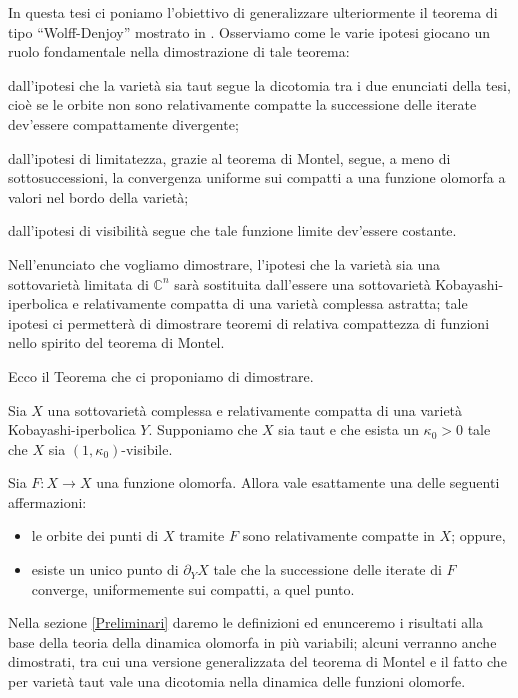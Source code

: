 In questa tesi ci poniamo l'obiettivo di generalizzare ulteriormente il teorema di tipo ``Wolff-Denjoy'' mostrato in \cite{CMS}. Osserviamo come le varie ipotesi giocano un ruolo fondamentale nella dimostrazione di tale teorema:
\begin{nlist}
    \item dall'ipotesi che la varietà sia taut segue la dicotomia tra i due enunciati della tesi, cioè se le orbite non sono relativamente compatte la successione delle iterate dev'essere compattamente divergente;
    \item dall'ipotesi di limitatezza, grazie al teorema di Montel, segue, a meno di sottosuccessioni, la convergenza uniforme sui compatti a una funzione olomorfa a valori nel bordo della varietà;
    \item dall'ipotesi di visibilità segue che tale funzione limite dev'essere costante.
\end{nlist}

Nell'enunciato che vogliamo dimostrare, l'ipotesi che la varietà sia una sottovarietà limitata di $\mathbb{C}^n$ sarà sostituita dall'essere una sottovarietà Kobayashi-iperbolica e relativamente compatta di una varietà complessa astratta; tale ipotesi ci permetterà di dimostrare teoremi di relativa compattezza di funzioni nello spirito del teorema di Montel.

Ecco il Teorema che ci proponiamo di dimostrare.

\begin{thm*}
    Sia $X$ una sottovarietà complessa e relativamente compatta di una varietà Kobayashi-iperbolica $Y$. Supponiamo che $X$ sia taut e che esista un $\kappa_0>0$ tale che $X$ sia $(1,\kappa_0)$-visibile.
    
    Sia $F:X \longrightarrow X$ una funzione olomorfa. Allora vale esattamente una delle seguenti affermazioni:
    \begin{itemize}
        \item le orbite dei punti di $X$ tramite $F$ sono relativamente compatte in $X$; oppure,
        \item esiste un unico punto di $\partial_YX$ tale che la successione delle iterate di $F$ converge, uniformemente sui compatti, a quel punto.
    \end{itemize}
\end{thm*}

Nella sezione \ref{Preliminari} daremo le definizioni ed enunceremo i risultati alla base della teoria della dinamica olomorfa in più variabili; alcuni verranno anche dimostrati, tra cui una versione generalizzata del teorema di Montel e il fatto che per varietà taut vale una dicotomia nella dinamica delle funzioni olomorfe.

